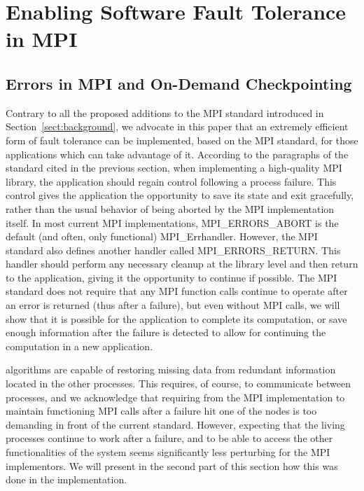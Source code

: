 \section{Enabling Software Fault Tolerance in MPI}
\label{sect:ompi}


\subsection{Errors in MPI and On-Demand Checkpointing}

Contrary to all the proposed additions to the MPI standard introduced
in Section~\ref{sect:background}, we advocate in this paper that an
extremely efficient form of fault tolerance can be implemented, based
on the MPI standard, for those applications which can take advantage
of it. According to the paragraphs of the standard cited in the
previous section, when implementing a high-quality MPI library, the
application should regain control following a process failure.  This
control gives the application the opportunity to save
its state and exit gracefully, rather than the usual behavior of being
aborted by the MPI implementation itself. In most current MPI
implementations, MPI\_ERRORS\_ABORT is the default (and often, only
functional) MPI\_Errhandler.  However, the MPI standard also defines
another handler called MPI\_ERRORS\_RETURN. This handler
should perform any necessary cleanup at the library level and then
return to the application, giving it the opportunity to continue if
possible. The MPI standard does not require that any MPI function
calls continue to operate after an error is returned (thus after a
failure), but even without MPI calls, we will show that it is possible
for the application to complete its computation, or save enough
information after the failure is detected to allow for continuing the
computation in a new application.

\abft algorithms are capable of restoring missing data from redundant
information located in the other processes. This requires, of course,
to communicate between processes, and we acknowledge that requiring
from the MPI implementation to maintain functioning MPI calls after a
failure hit one of the nodes is too demanding in front of the current
standard. However, expecting that the living processes continue to
work after a failure, and to be able to access the other functionalities
of the system seems significantly less perturbing for the MPI
implementors. We will present in the second part of this section how
this was done in the \ompi implementation.

